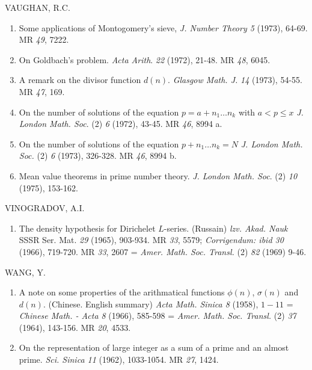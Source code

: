 \begin{thebibliography}{99}
 VAUGHAN, R.C.
\begin{enumerate}
\item Some applications of Montogomery's sieve, \textit{J. Number
  Theory 5} (1973), 64-69. MR {\em 49}, 7222. 

\item On Goldbach's problem. \textit{Acta Arith}. {\em 22} (1972),
  21-48. MR {\em 48}, 6045. 

\item A remark on the divisor function $d(n)$. \textit{Glasgow
  Math. J.} {\em 14} (1973), 54-55. MR {\em 47}, 169.  

\item On the number of solutions of the equation $p=a+n_1\ldots n_k$
  with $a<p\leq x$ \textit{J. London Math. Soc}. (2) {\em 6} (1972),
  43-45. MR {\em 46}, 8994 a.  

\item On the number of solutions of the equation $p+ n_{1}\ldots
  n_k=N$ {\em J. London Math. Soc.} (2) {\em 6} (1973), 326-328. MR
  {\em 46}, 8994 b.  

\item Mean value theorems in prime number theory. \textit{J. London
  Math. Soc}. (2) {\em 10} (1975), 153-162. 
\end{enumerate}

 VINOGRADOV, A.I.
\begin{enumerate}
\item The density hypothesis for Dirichelet $L$-series. (Russain)
  {\em lzv. Akad. Nauk} SSSR Ser. Mat. {\em 29} (1965), 903-934. MR
  {\em 33},
  5579; \textit{Corrigendum: ibid 30} (1966), 719-720. MR {\em 33}, 2607
  = \textit{Amer. Math. Soc. Transl.} (2) {\em 82} (1969) 9-46. 
\end{enumerate}

 WANG, Y.\pageoriginale 
\begin{enumerate}
\item A note on some properties of the arithmatical functions
  $\phi(n)$, $\sigma(n)$ and $d(n)$. (Chinese. English summary)
  \textit{Acta Math. Sinica 8} (1958), 
  $1-11$ = {\em Chinese Math. - Acta 8} (1966), 585-598 = {\em
    Amer. Math. Soc. Transl.} (2) {\em 37} (1964),
  143-156. MR {\em 20}, 4533. 

\item On the representation of large integer as a sum of a prime and an
  almost prime. {\em Sci. Sinica 11} (1962), 1033-1054. MR {\em 27}, 1424. 
\end{enumerate}


\end{thebibliography}
